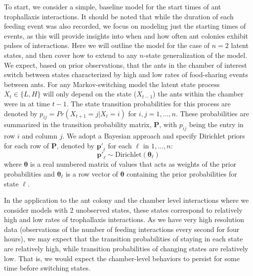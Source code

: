 \documentclass[smallextended]{svjour3}       %
\begin{document}
To start, we consider a simple, baseline model for the start times of ant trophallaxis interactions. It should be noted that while the duration of each feeding event was also recorded, we focus on modeling just the starting times of events, as this will provide insights into when and how often ant colonies exhibit pulses of interactions. Here we will outline the model for the case of $n=2$ latent states, and then cover how to extend to any $n$-state generalization of the model. We expect, based on prior observations, that the ants in the chamber of interest switch between states characterized by high and low rates of food-sharing events between ants. 
For any Markov-switching model the latent state process $X_t \in \{L, H\}$ will only depend on the state ($X_{t - 1}$) the ants within the chamber were in at time $t - 1$. The state transition probabilities for this process are denoted by $p_{ij} = Pr(X_{t+1} = j | X_t = i)$ for $i, j = 1, \dots, n$. These probabilities are summarized in the transition probability matrix, $\mathbf{P}$, with $p_{ij}$ being the entry in row $i$ and column $j$. We adopt a Bayesian approach and specify Dirichlet priors for each row of $\mathbf{P}$, denoted by $\mathbf{p'}_\ell$ for each $\ell$ in $1, \dots, n$:  
\begin{equation}
\mathbf{p'}_\ell \sim \text{Dirichlet}(\bm{\theta}_\ell)
\end{equation}
where $\bm{\theta}$ is a real numbered matrix of values that acts as weights of the prior probabilities and $\bm{\theta}_\ell$ is a row vector of $\bm{\theta}$ containing the prior probabilities for state $\ell$. 

In the application to the ant colony and the chamber level interactions where we consider models with 2 unobserved states, these states correspond to relatively high and low rates of trophallaxis interactions. As we have very high resolution data (observations of the number of feeding interactions every second for four hours), we may expect that the transition probabilities of staying in each state are relatively high, while transition probabilities of changing states are relatively low. That is, we would expect the chamber-level behaviors to persist for some time before switching states. 
\end{document}
